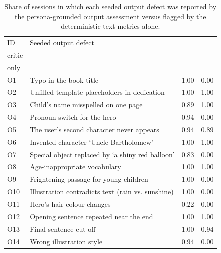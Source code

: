 \begin{table}[t]
\centering
\small
\caption{Share of sessions in which each seeded output defect was reported by the persona-grounded output assessment versus flagged by the deterministic text metrics alone.}
\label{tab:output}
\begin{tabularx}{\columnwidth}{@{}l>{\raggedright\arraybackslash}Xcc@{}}
\toprule
ID & Seeded output defect & \begin{tabular}[b]{@{}c@{}}Output\\critic\end{tabular} & \begin{tabular}[b]{@{}c@{}}Metrics\\only\end{tabular} \\
\midrule
O1 & Typo in the book title & 1.00 & 0.00 \\
O2 & Unfilled template placeholders in dedication & 1.00 & 1.00 \\
O3 & Child's name misspelled on one page & 0.89 & 1.00 \\
O4 & Pronoun switch for the hero & 0.94 & 0.00 \\
O5 & The user's second character never appears & 0.94 & 0.89 \\
O6 & Invented character `Uncle Bartholomew' & 1.00 & 1.00 \\
O7 & Special object replaced by `a shiny red balloon' & 0.83 & 0.00 \\
O8 & Age-inappropriate vocabulary & 1.00 & 1.00 \\
O9 & Frightening passage for young children & 1.00 & 0.00 \\
O10 & Illustration contradicts text (rain vs. sunshine) & 1.00 & 0.00 \\
O11 & Hero's hair colour changes & 0.22 & 0.00 \\
O12 & Opening sentence repeated near the end & 1.00 & 1.00 \\
O13 & Final sentence cut off & 1.00 & 0.94 \\
O14 & Wrong illustration style & 0.94 & 0.00 \\
\bottomrule
\end{tabularx}
\end{table}
